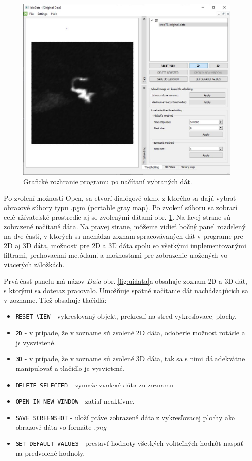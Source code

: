 \documentclass[a4paper,11pt,oneside]{article}%
\begin{document}
\begin{figure}[h!]
 \begin{center} 
 \includegraphics[scale=0.50]{pics/ui1.jpg}
\caption{Grafické rozhranie programu po načítaní vybraných dát.}
\label{fig:ui1}
\end{center} 
\end{figure}

Po zvolení možnosti Open, sa otvorí dialógové okno, z ktorého sa dajú vybrať obrazové súbory typu .pgm (portable gray map). Po zvolení súboru sa zobrazí celé užívateľské prostredie aj so zvolenými dátami obr. \ref{fig:ui1}. Na ľavej strane sú zobrazené načítané dáta. Na pravej strane, môžeme vidieť bočný panel rozdelený na dve časti, v ktorých sa nachádza zoznam spracovávaných dát v programe pre 2D aj 3D dáta, možnosti pre 2D a 3D dáta spolu so všetkými implementovanými filtrami, prahovacími metódami a možnosťami pre zobrazenie uložených vo viacerých záložkách. 

Prvá časť panelu má názov \textit{Data} obr. \ref{fig:uidata}a obsahuje zoznam 2D a 3D dát, s ktorými sa doteraz pracovalo. Umožňuje spätné načítanie dát nachádzajúcich sa v zozname. Tiež obsahuje tlačidlá: 
\begin{itemize}
\item \texttt{RESET VIEW} - vykresľovaný objekt, prekreslí na stred vykresľovacej plochy.  
\item \texttt{2D} - v prípade, že v zozname sú zvolené 2D dáta, odoberie možnosť rotácie a je vysvietené.
\item \texttt{3D} - v prípade, že v zozname sú zvolené 3D dáta, tak sa s nimi dá adekvátne manipulovať a tlačidlo je vysvietené.
\item \texttt{DELETE SELECTED} - vymaže zvolené dáta zo zoznamu.
\item \texttt{OPEN IN NEW WINDOW} - zatiaľ neaktívne.
\item \texttt{SAVE SCREENSHOT} - uloží práve zobrazené dáta z vykresľovacej plochy ako obrazové dáta vo formáte \textit{.png}
\item \texttt{SET DEFAULT VALUES} - prestaví hodnoty všetkých voliteľných hodnôt naspäť na predvolené hodnoty.
\end{itemize}
\end{document}
